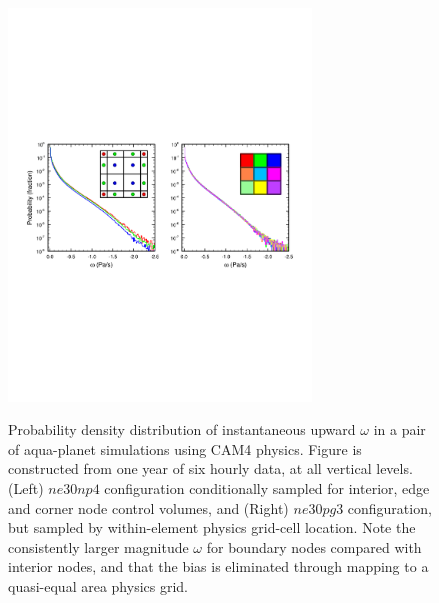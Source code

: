 \documentclass[twocol]{ametsoc}
\begin{document}
\begin{figure}[t]
\noindent\includegraphics[width=19pc,angle=0]{figs/temp_pdf_omg_np4_v_pg3_CROP.pdf}\\
\caption{Probability density distribution of instantaneous upward $\omega$ in a pair of aqua-planet simulations using CAM4 physics. Figure is constructed from one year of six hourly data, at all vertical levels. (Left) $ne30np4$ configuration conditionally sampled for interior, edge and corner node control volumes, and (Right) $ne30pg3$ configuration, but sampled by within-element physics grid-cell location. Note the consistently larger magnitude $\omega$ for boundary nodes compared with interior nodes, and that the bias is eliminated through mapping to a quasi-equal area physics grid.}\label{fig:omega-se-volumes}
\end{figure}
\end{document}

